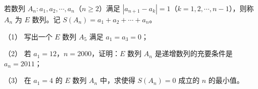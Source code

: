 \begin{question}
若数列 $A_n:a_1,a_2,\cdots,a_n$（$n\geqslant 2$）满足 $|a_{n+1}-a_k|=1$（$k=1,2,\cdots,n-1$），则称 $A_n$ 为 $E$ 数列。记 $S(A_n)=a_1+a_2+\cdots+a_n$。

（1） 写出一个 $E$ 数列 $A_5$ 满足 $a_1=a_3=0$；

（2） 若 $a_1=12$，$n=2000$，证明：$E$ 数列 $A_n$ 是递增数列的充要条件是 $a_n=2011$；

（3） 在 $a_1=4$ 的 $E$ 数列 $A_n$ 中，求使得 $S(A_n)=0$ 成立的 $n$ 的最小值。

\end{question}